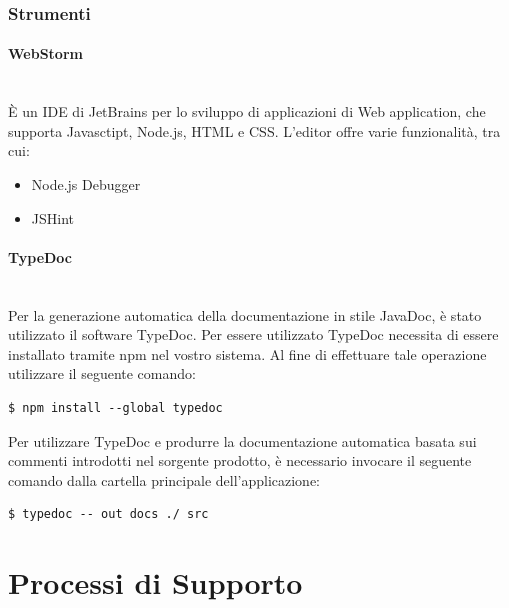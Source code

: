 \documentclass[11pt,a4paper]{article}
\begin{document}
{\begin{lstlisting}[caption=Esempio di commento ad un metodo]
	\end{lstlisting}
	
	\subsubsection{Strumenti}
	\paragraph{WebStorm} \noindent \\
	È un IDE di JetBrains per lo sviluppo di applicazioni di Web application, che supporta Javasctipt, Node.js, HTML e CSS.
	L'editor offre varie funzionalità, tra cui:
	\begin{itemize}
		\item Node.js Debugger
		\item JSHint
	\end{itemize}

	\paragraph{TypeDoc}
	\noindent \\
	Per la generazione automatica della documentazione in stile JavaDoc, è stato utilizzato il software TypeDoc. Per essere utilizzato TypeDoc necessita di essere installato tramite npm nel vostro sistema. Al fine di effettuare tale operazione utilizzare il seguente comando:
	
	\begin{minipage}{.5\textwidth}
		\begin{lstlisting}[caption=Installazione di TypeDoc,numbers=none]
			$ npm install --global typedoc
		\end{lstlisting}
	\end{minipage}		
	
	Per utilizzare TypeDoc e produrre la documentazione automatica basata sui commenti introdotti nel sorgente prodotto, è necessario invocare il seguente comando dalla cartella principale dell’applicazione:
	
	\begin{minipage}{.5\textwidth}
		\begin{lstlisting}[caption=Installazione di TSLint,numbers=none]
			$ typedoc -- out docs ./ src
		\end{lstlisting}
	\end{minipage}		
	
	
		\section{Processi di Supporto}
}
\end{document}
